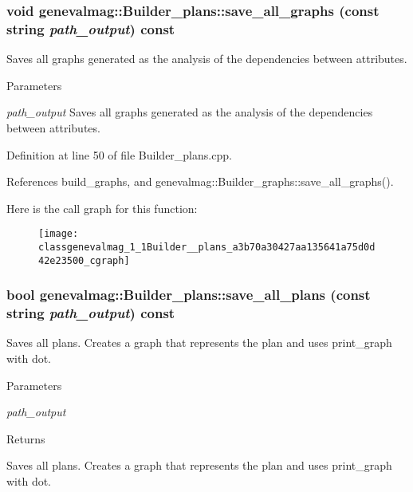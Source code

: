 \hypertarget{classgenevalmag_1_1Builder__plans_a3b70a30427aa135641a75d0d42e23500}{
\subsubsection[{save\_\-all\_\-graphs}]{\setlength{\rightskip}{0pt plus 5cm}void genevalmag::Builder\_\-plans::save\_\-all\_\-graphs (const string {\em path\_\-output}) const}}
\label{classgenevalmag_1_1Builder__plans_a3b70a30427aa135641a75d0d42e23500}
Saves all graphs generated as the analysis of the dependencies between attributes. 
\begin{DoxyParams}{Parameters}
\item[{\em path\_\-output}]Saves all graphs generated as the analysis of the dependencies between attributes. \end{DoxyParams}


Definition at line 50 of file Builder\_\-plans.cpp.



References build\_\-graphs, and genevalmag::Builder\_\-graphs::save\_\-all\_\-graphs().



Here is the call graph for this function:\nopagebreak
\begin{figure}[H]
\begin{center}
\leavevmode
\texttt{[image: classgenevalmag\_1\_1Builder\_\_plans\_a3b70a30427aa135641a75d0d42e23500\_cgraph]}
\end{center}
\end{figure}


\hypertarget{classgenevalmag_1_1Builder__plans_aa15ea4156613c75cfca5ecc0bd6a5193}{
\subsubsection[{save\_\-all\_\-plans}]{\setlength{\rightskip}{0pt plus 5cm}bool genevalmag::Builder\_\-plans::save\_\-all\_\-plans (const string {\em path\_\-output}) const}}
\label{classgenevalmag_1_1Builder__plans_aa15ea4156613c75cfca5ecc0bd6a5193}
Saves all plans. Creates a graph that represents the plan and uses print\_\-graph with dot. 
\begin{DoxyParams}{Parameters}
\item[{\em path\_\-output}]\end{DoxyParams}
\begin{DoxyReturn}{Returns}

\end{DoxyReturn}
Saves all plans. Creates a graph that represents the plan and uses print\_\-graph with dot. 

